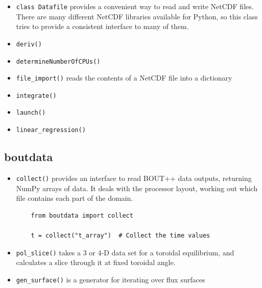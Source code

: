 \documentclass[12pt]{article}
\begin{document}
\begin{itemize}
\item \lstinline!class Datafile! provides a convenient way to read and write NetCDF files. There are many different
  NetCDF libraries available for Python, so this class tries to provide a consistent interface to many of them.
\item \lstinline!deriv()!
\item \lstinline!determineNumberOfCPUs()!
\item \lstinline!file_import()! reads the contents of a NetCDF file into a dictionary
\item \lstinline!integrate()!
\item \lstinline!launch()!
\item \lstinline!linear_regression()!
\end{itemize}

\subsection{boutdata}

\begin{itemize}
\item \lstinline!collect()! provides an interface to read BOUT++ data outputs, returning NumPy arrays of data. 
  It deals with the processor layout, working out which file contains each part of the domain.
  \begin{lstlisting}
    from boutdata import collect
    
    t = collect("t_array")  # Collect the time values
  \end{lstlisting}
\item \lstinline!pol_slice()! takes a 3 or 4-D data set for a toroidal equilibrium, and calculates a slice
  through it at fixed toroidal angle.
\item \lstinline!gen_surface()! is a generator for iterating over flux surfaces
\end{itemize}

\printindex
\end{document}
